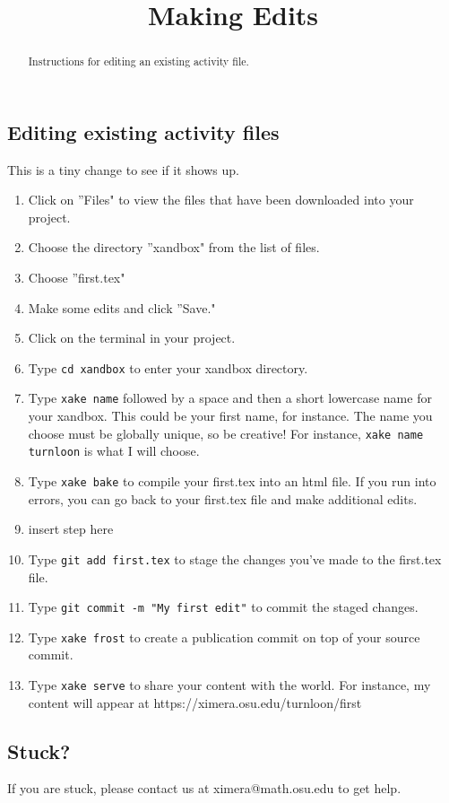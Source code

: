 \documentclass{ximera}
\title{Making Edits}
\begin{document}
\begin{abstract}
Instructions for editing an existing activity file.
\end{abstract}
\maketitle


\subsection{Editing existing activity files}
This is a tiny change to see if it shows up.
\begin{enumerate}

\item Click on ''Files" to view the files that have been downloaded into your project.
\item Choose the directory ''xandbox" from the list of files.
\item Choose ''first.tex"
\item Make some edits and click ''Save."
\item Click on the terminal in your project.
\item Type \verb!cd xandbox! to enter your xandbox directory.
\item Type \verb!xake name! followed by a space and then a short lowercase name for your xandbox.  This could be your first name, for instance.  The name you choose must be globally unique, so be creative!  For instance, \verb!xake name turnloon! is what I will choose.
\item Type \verb!xake bake! to compile your first.tex into an html file.  If you run into errors, you can go back to your first.tex file and make additional edits.
\item insert step here
\item Type \verb!git add first.tex! to stage the changes you've made to the first.tex file.
\item Type \verb!git commit -m "My first edit"! to commit the staged changes.
\item Type \verb!xake frost! to create a publication commit on top of your source commit.
\item Type \verb!xake serve! to share your content with the world.  For instance, my content will appear at https://ximera.osu.edu/turnloon/first
\end{enumerate}
\subsection{Stuck?}

If you are stuck, please contact us at ximera@math.osu.edu to get help.
\end{document}
